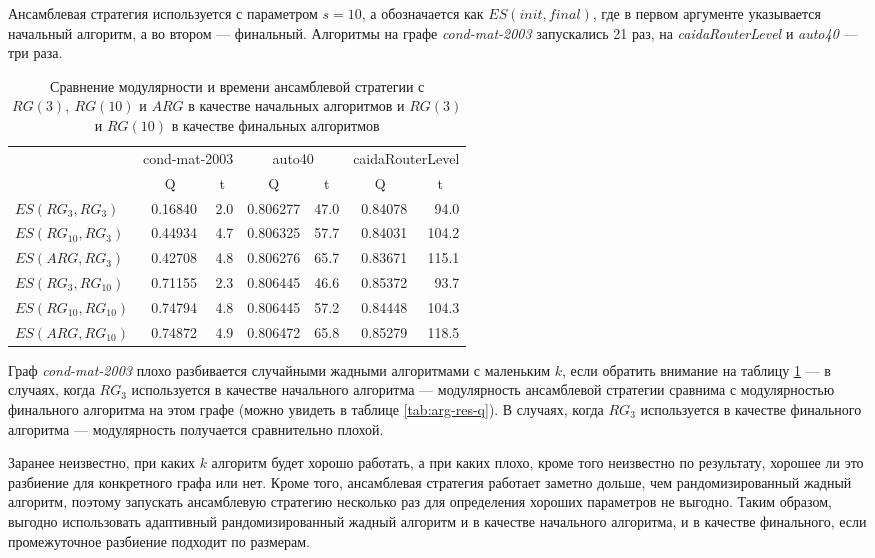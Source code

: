 Ансамблевая стратегия используется с параметром $s = 10$, а обозначается как $ES(init, final)$, где в первом аргументе указывается начальный алгоритм, а во втором --- финальный. Алгоритмы на графе \emph{cond-mat-2003} запускались 21 раз, на \emph{caidaRouterLevel} и \emph{auto40} --- три раза.

\begin{table}[H]
	\caption{Сравнение модулярности и времени ансамблевой стратегии с $RG(3),\ RG(10)$ и $ARG$ в качестве начальных алгоритмов и $RG(3)$ и $RG(10)$ в качестве финальных алгоритмов}
	\label{tab:es1-q}
	\begin{tabularx}{\textwidth}{Xrrrrrr}	\hline
								& \multicolumn{2}{c}{cond-mat-2003}	& \multicolumn{2}{c}{auto40}	& \multicolumn{2}{c}{caidaRouterLevel} 	\\
								& \multicolumn{1}{c}{Q} & \multicolumn{1}{c}{t} & \multicolumn{1}{c}{Q} & \multicolumn{1}{c}{t} & \multicolumn{1}{c}{Q} & \multicolumn{1}{c}{t} \\\hline
		$ES(RG_3, RG_3)$		& 0.16840	& 2.0	& 0.806277	& 47.0	& 0.84078	& 94.0	\\
		$ES(RG_{10}, RG_3)$		& 0.44934	& 4.7	& 0.806325	& 57.7	& 0.84031	& 104.2	\\
		$ES(ARG, RG_3)$			& 0.42708	& 4.8	& 0.806276	& 65.7	& 0.83671	& 115.1	\\
		$ES(RG_3, RG_{10})$		& 0.71155	& 2.3 	& 0.806445	& 46.6	& 0.85372	& 93.7	\\
		$ES(RG_{10}, RG_{10})$	& 0.74794	& 4.8	& 0.806445	& 57.2	& 0.84448	& 104.3	\\
		$ES(ARG, RG_{10})$		& 0.74872	& 4.9	& 0.806472	& 65.8	& 0.85279	& 118.5	\\\hline
	\end{tabularx}
\end{table}

Граф \emph{cond-mat-2003} плохо разбивается случайными жадными алгоритмами с маленьким $k$, если обратить внимание на таблицу \ref{tab:es1-q} --- в случаях, когда $RG_3$ используется в качестве начального алгоритма --- модулярность ансамблевой стратегии сравнима с модулярностью финального алгоритма на этом графе (можно увидеть в таблице \ref{tab:arg-res-q}). В случаях, когда $RG_3$ используется в качестве финального алгоритма --- модулярность получается сравнительно плохой.

Заранее неизвестно, при каких $k$ алгоритм будет хорошо работать, а при каких плохо, кроме того неизвестно по результату, хорошее ли это разбиение для конкретного графа или нет. Кроме того, ансамблевая стратегия работает заметно дольше, чем рандомизированный жадный алгоритм, поэтому запускать ансамблевую стратегию несколько раз для определения хороших параметров не выгодно. Таким образом, выгодно использовать адаптивный рандомизированный жадный алгоритм и в качестве начального алгоритма, и в качестве финального, если промежуточное разбиение подходит по размерам.


